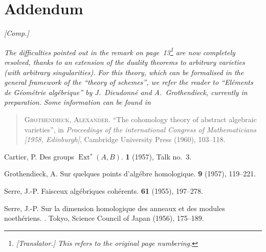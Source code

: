 \documentclass{article}
\DeclareMathOperator{\Ext}{Ext}
\begin{document}
\section*{Addendum}
\label{addendum}

\emph{[Comp.]}

\emph{The difficulties pointed out in the remark on page~13\footnote{\emph{[Translator.] This refers to the original page numbering.}} are now completely resolved, thanks to an extension of the duality theorems to arbitrary varieties (with arbitrary singularities).}
\emph{For this theory, which can be formalised in the general framework of the ``theory of schemes'', we refer the reader to ``El\'{e}ments de G\'{e}om\'{e}trie alg\'{e}brique'' by J.~Dieudonn\'{e} and A.~Grothendieck, currently in preparation.}
\emph{Some information can be found in}

\begin{quote}
  \textsc{Grothendieck, Alexander.} ``The cohomology theory of abstract algebraic varieties'', in \emph{Proceedings of the international Congress of Mathematicians [1958, Edinburgh]}, Cambridge University Press (1960), 103--118.
\end{quote}

\noindent[April, 1959]



\nocite{*}
% 
\begin{thebibliography}{4}

  {Cartier, P.}
  \newblock Des groups $\Ext^s(A,B)$.
   \textbf{1} (1957), Talk no.~3.

  {Grothendieck, A.}
  \newblock Sur quelques points d'alg\'{e}bre homologique.
   {\bf 9} (1957), 119--221.

  {Serre, J.-P.}
  \newblock Faisceux alg\'{e}briques coh\'{e}rents.
   {\bf 61} (1955), 197--278.

  {Serre, J.-P.}
  \newblock Sur la dimension homologique des anneaux et des modules noeth\'{e}riens.
  .
  \newblock Tokyo, Science Council of Japan (1956), 175--189.

\end{thebibliography}
\end{document}
